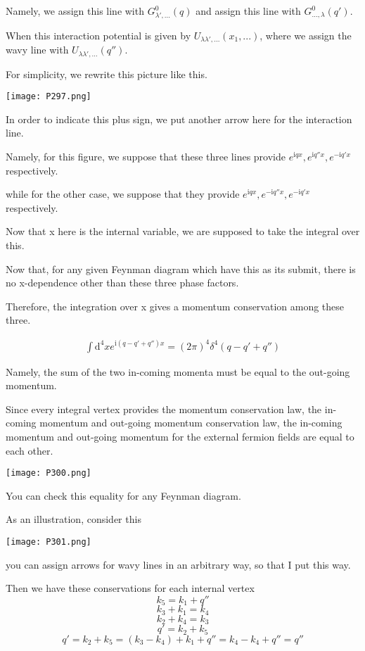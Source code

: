 Namely, we assign this line with $G_{\lambda',...}^0(q)$ and assign this line with $G_{...,\lambda}^0(q')$.

When this interaction potential is given by $U_{\lambda\lambda',...}(x_1,...)$, where we assign the wavy line with $U_{\lambda\lambda',...}(q'')$.


For simplicity, we rewrite this picture like this.
\begin{center}
\texttt{[image: P297.png]}
\end{center}
In order to indicate this plus sign, we put another arrow here for the interaction line.

Namely, for this figure, we suppose that these three lines provide $e^{\mathrm{i}qx},e^{\mathrm{i}q''x},e^{-\mathrm{i}q'x}$ respectively.

while for the other case, we suppose that they provide $e^{\mathrm{i}qx},e^{-\mathrm{i}q''x},e^{-\mathrm{i}q'x}$ respectively.

Now that x here is the internal variable, we are supposed to take the integral over this.

Now that, for any given Feynman diagram which have this as its submit, there is no x-dependence other than these three phase factors.

Therefore, the integration over x gives a momentum conservation among these three.

\begin{align}
\int \mathrm{d}^4xe^{\mathrm{i}(q-q'+q'')x}=(2\pi)^4\delta^4(q-q'+q'') \nonumber
\end{align}

Namely, the sum of the two in-coming momenta must be equal to the out-going momentum.


Since every integral vertex provides the momentum conservation law, the in-coming momentum and out-going momentum conservation law, the in-coming momentum and out-going momentum for the external fermion fields are equal to each  other.
\begin{center}
\texttt{[image: P300.png]}
\end{center}
You can check this equality for any Feynman diagram.

As an illustration, consider this 
\begin{center}
\texttt{[image: P301.png]}
\end{center}
you can assign arrows for wavy lines in an arbitrary way, so that I put this way.

Then we have these conservations for each internal vertex
$$k_5=k_1+q''$$$$k_3+k_1=k_4$$$$k_2+k_4=k_3$$$$q'=k_2+k_5$$$$q'=k_2+k_5=(k_3-k_4)+k_1+q''=k_4-k_4+q''=q''$$

